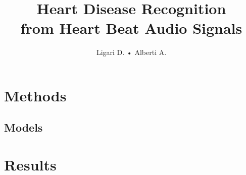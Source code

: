 \documentclass[twocolumn]{class}
\title{Heart Disease Recognition \\ from Heart Beat Audio Signals}
\author{Ligari D. • Alberti A.}
\begin{document}
\maketitle
\pagestyle{FirstPage}

\tableofcontents




\pagestyle{OtherPage}

\section{Methods}




\subsection{Models} %







\section{Results}







\clearpage


\clearpage
\printbibliography
\end{document}
